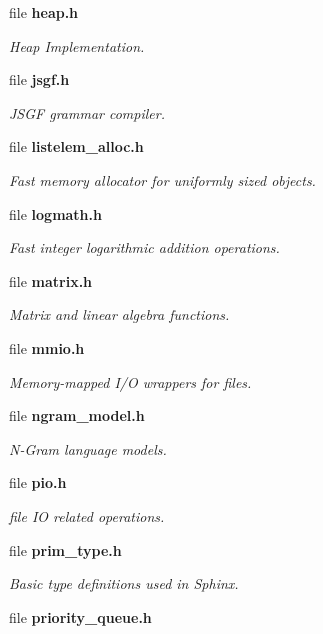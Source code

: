 \begin{DoxyCompactItemize}
file {\bf heap.\-h}
\begin{DoxyCompactList}\small\item\em Heap Implementation. \end{DoxyCompactList}\item 
file {\bf jsgf.\-h}
\begin{DoxyCompactList}\small\item\em J\-S\-G\-F grammar compiler. \end{DoxyCompactList}\item 
file {\bf listelem\-\_\-alloc.\-h}
\begin{DoxyCompactList}\small\item\em Fast memory allocator for uniformly sized objects. \end{DoxyCompactList}\item 
file {\bf logmath.\-h}
\begin{DoxyCompactList}\small\item\em Fast integer logarithmic addition operations. \end{DoxyCompactList}\item 
file {\bf matrix.\-h}
\begin{DoxyCompactList}\small\item\em Matrix and linear algebra functions. \end{DoxyCompactList}\item 
file {\bf mmio.\-h}
\begin{DoxyCompactList}\small\item\em Memory-\/mapped I/\-O wrappers for files. \end{DoxyCompactList}\item 
file {\bf ngram\-\_\-model.\-h}
\begin{DoxyCompactList}\small\item\em N-\/\-Gram language models. \end{DoxyCompactList}\item 
file {\bf pio.\-h}
\begin{DoxyCompactList}\small\item\em file I\-O related operations. \end{DoxyCompactList}\item 
file {\bf prim\-\_\-type.\-h}
\begin{DoxyCompactList}\small\item\em Basic type definitions used in Sphinx. \end{DoxyCompactList}\item 
file {\bfseries priority\-\_\-queue.\-h}

\end{DoxyCompactItemize}
